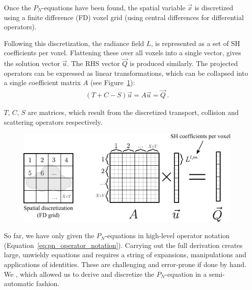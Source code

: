Once the $P_N$-equations have been found, the spatial variable $\vec{x}$ is discretized using a finite difference (FD) voxel grid (using central differences for differential operators).

Following this discretization, the radiance field $L$, is represented as a set of SH coefficients per voxel. Flattening these over all voxels into a single vector, gives the solution vector $\vec{u}$. The RHS vector $\vec{Q}$ is produced similarly. The projected operators can be expressed as linear transformations, which can be collapsed into a single coefficient matrix $A$ (see Figure~\ref{fig:matrix_layout}):
\begin{align}
(T+C-S)\vec{u} = A\vec{u} = \vec{Q}
\ .
\end{align}

$T$, $C$, $S$ are matrices, which result from the discretized transport, collision and scattering operators respectively.

\begin{figure}[h]
\centering
\includegraphics[width=\columnwidth]{figures/fig_matrix_layout.pdf}
\vspace{-0.2in}
\label{fig:matrix_layout}
\end{figure}

So far, we have only given the $P_N$-equations in high-level operator notation (Equation~\ref{eq:pn_operator_notation}). Carrying out the full derivation creates large, unwieldy equations and requires a string of expansions, manipulations and applications of identities. These are challenging and error-prone if done by hand. We , which allowed us to derive and discretize the $P_N$-equation in a semi-automatic fashion.

